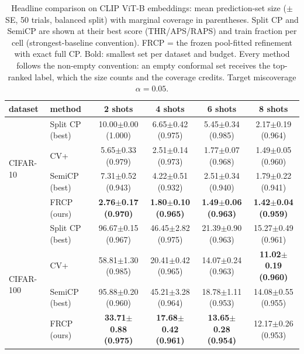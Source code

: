 \begin{table}[t]
\centering
\small
\caption{Headline comparison on CLIP ViT-B embeddings: mean prediction-set size ($\pm$ SE, 50 trials, balanced split) with marginal coverage in parentheses. Split CP and SemiCP are shown at their best score (THR/APS/RAPS) and train fraction per cell (strongest-baseline convention). FRCP = the frozen pool-fitted refinement with exact full CP. Bold: smallest set per dataset and budget. Every method follows the non-empty convention: an empty conformal set receives the top-ranked label, which the size counts and the coverage credits. Target miscoverage $\alpha=0.05$.}
\label{tab:headline-clipb-a005}
\begin{tabular}{llcccc}
\toprule
dataset & method & 2 shots & 4 shots & 6 shots & 8 shots\\
\midrule
\multirow{4}{*}{CIFAR-10} & Split CP (best) & 10.00$\pm$0.00 {\scriptsize(1.000)} & 6.65$\pm$0.42 {\scriptsize(0.975)} & 5.45$\pm$0.34 {\scriptsize(0.985)} & 2.17$\pm$0.19 {\scriptsize(0.964)}\\
 & CV+ & 5.65$\pm$0.33 {\scriptsize(0.979)} & 2.51$\pm$0.14 {\scriptsize(0.973)} & 1.77$\pm$0.07 {\scriptsize(0.968)} & 1.49$\pm$0.05 {\scriptsize(0.960)}\\
 & SemiCP (best) & 7.31$\pm$0.52 {\scriptsize(0.943)} & 4.22$\pm$0.51 {\scriptsize(0.932)} & 2.51$\pm$0.34 {\scriptsize(0.940)} & 1.79$\pm$0.22 {\scriptsize(0.941)}\\
 & FRCP (ours) & \textbf{2.76$\pm$0.17 {\scriptsize(0.970)}} & \textbf{1.80$\pm$0.10 {\scriptsize(0.965)}} & \textbf{1.49$\pm$0.06 {\scriptsize(0.963)}} & \textbf{1.42$\pm$0.04 {\scriptsize(0.959)}}\\
\midrule
\multirow{4}{*}{CIFAR-100} & Split CP (best) & 96.67$\pm$0.15 {\scriptsize(0.967)} & 46.45$\pm$2.82 {\scriptsize(0.975)} & 21.39$\pm$0.90 {\scriptsize(0.963)} & 15.27$\pm$0.49 {\scriptsize(0.961)}\\
 & CV+ & 58.81$\pm$1.30 {\scriptsize(0.985)} & 20.41$\pm$0.42 {\scriptsize(0.965)} & 14.07$\pm$0.24 {\scriptsize(0.963)} & \textbf{11.02$\pm$0.19 {\scriptsize(0.960)}}\\
 & SemiCP (best) & 95.88$\pm$0.20 {\scriptsize(0.960)} & 45.21$\pm$3.28 {\scriptsize(0.964)} & 18.78$\pm$1.11 {\scriptsize(0.953)} & 14.08$\pm$0.55 {\scriptsize(0.955)}\\
 & FRCP (ours) & \textbf{33.71$\pm$0.88 {\scriptsize(0.975)}} & \textbf{17.68$\pm$0.42 {\scriptsize(0.961)}} & \textbf{13.65$\pm$0.28 {\scriptsize(0.954)}} & 12.17$\pm$0.26 {\scriptsize(0.953)}\\

\end{tabular}
\end{table}
